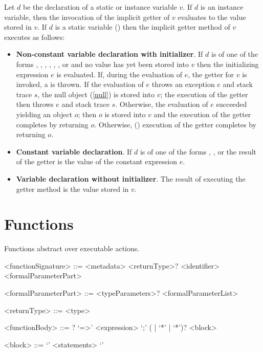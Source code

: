 \documentclass[makeidx]{article}
\begin{document}
\LMHash{}%
Let $d$ be the declaration of a static or instance variable $v$.
If $d$ is an instance variable,
then the invocation of the implicit getter of $v$ evaluates to
the value stored in $v$.
If $d$ is a static variable
()
then the implicit getter method of $v$ executes as follows:
\begin{itemize}
\item {\bf Non-constant variable declaration with initializer}.
If $d$ is of one of the forms
,
,
,
,
,
,
 or
and no value has yet been stored into $v$
then the initializing expression $e$ is evaluated.
If, during the evaluation of $e$, the getter for $v$ is invoked,
a  is thrown.
If the evaluation of $e$ throws an exception $e$ and stack trace $s$,
the null object (\ref{null}) is stored into $v$;
the execution of the getter then throws $e$ and stack trace $s$.
Otherwise, the evaluation of $e$ succeeded yielding an object $o$;
then $o$ is stored into $v$ and
the execution of the getter completes by returning $o$.
Otherwise,
()
execution of the getter completes by returning $o$.
\item {\bf Constant variable declaration}.
If $d$ is of one of the forms
,
,
 or
the result of the getter is the value of the constant expression $e$.
\item {\bf Variable declaration without initializer}.
The result of executing the getter method is the value stored in $v$.
\end{itemize}


\section{Functions}

\LMHash{}%
Functions abstract over executable actions.

\begin{grammar}
<functionSignature> ::= \gnewline{}
  <metadata> <returnType>? <identifier> <formalParameterPart>

<formalParameterPart> ::= <typeParameters>? <formalParameterList>

<returnType> ::= \VOID{}
  \alt <type>

<functionBody> ::= \ASYNC{}? `=>' <expression> `;'
  \alt (\ASYNC{} | \ASYNC `*' | \SYNC `*')? <block>

<block> ::= `{' <statements> `}'
\end{grammar}
\end{document}
